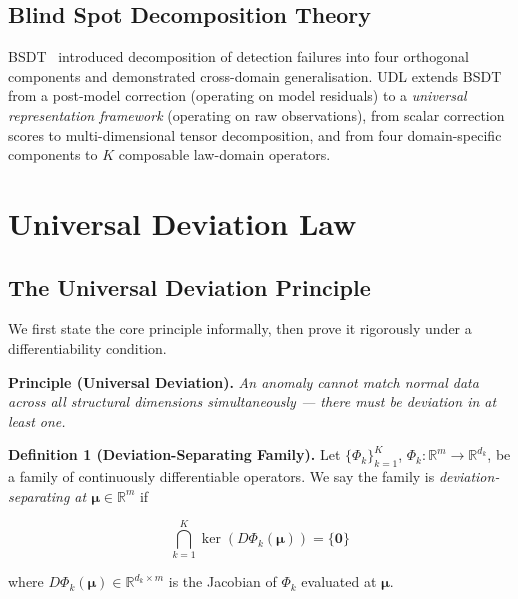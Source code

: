 \documentclass[journal]{IEEEtran}
\newcommand{\R}{\mathbb{R}}
\begin{document}
\subsection{Blind Spot Decomposition Theory}

BSDT~\cite{odeyemi2025bsdt} introduced decomposition of detection failures into four orthogonal components and demonstrated cross-domain generalisation. UDL extends BSDT from a post-model correction (operating on model residuals) to a \textit{universal representation framework} (operating on raw observations), from scalar correction scores to multi-dimensional tensor decomposition, and from four domain-specific components to $K$ composable law-domain operators.

\section{Universal Deviation Law}
\label{sec:theory}

\subsection{The Universal Deviation Principle}
\label{ssec:axiom}

We first state the core principle informally, then prove it rigorously under a differentiability condition.

\textbf{Principle (Universal Deviation).} \textit{An anomaly cannot match normal data across all structural dimensions simultaneously --- there must be deviation in at least one.}

\vspace{0.5em}

\textbf{Definition 1 (Deviation-Separating Family).} Let $\{\Phi_k\}_{k=1}^K$, $\Phi_k: \R^m \to \R^{d_k}$, be a family of continuously differentiable operators. We say the family is \textit{deviation-separating at $\boldsymbol{\mu} \in \R^m$} if

\begin{equation}
\bigcap_{k=1}^{K} \ker\!\left(D\Phi_k(\boldsymbol{\mu})\right) = \{\mathbf{0}\}
\label{eq:separating}
\end{equation}

where $D\Phi_k(\boldsymbol{\mu}) \in \R^{d_k \times m}$ is the Jacobian of $\Phi_k$ evaluated at $\boldsymbol{\mu}$.
\end{document}
